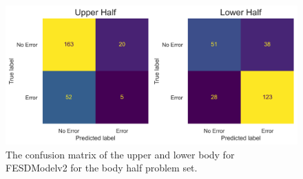 \begin{figure}[htbp]
  \centering
  \includegraphics[width=.8\linewidth]{figures/Results/v2/confusion/body_halves_half.png}
  \caption[Confusion matrix of FESDModelv2 for each Body Half]{The confusion matrix of the upper and lower body for FESDModelv2 for the body half problem set.}
  \label{fig:conf_v2_hb_ul}
\end{figure}

\FloatBarrier